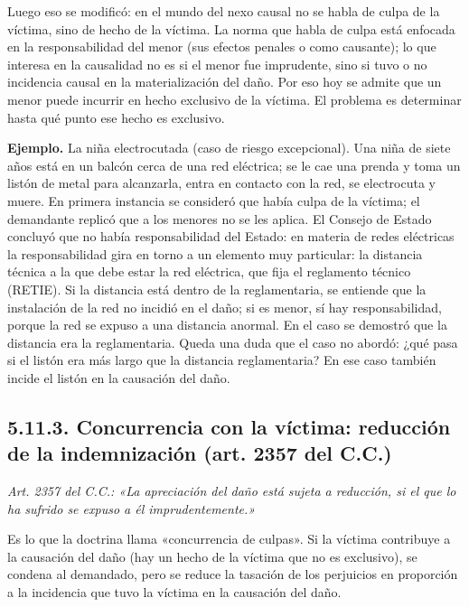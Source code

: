 Luego eso se modificó: en el mundo del nexo causal no se habla de culpa de la víctima, sino de hecho de la víctima. La norma que habla de culpa está enfocada en la responsabilidad del menor (sus efectos penales o como causante); lo que interesa en la causalidad no es si el menor fue imprudente, sino si tuvo o no incidencia causal en la materialización del daño. Por eso hoy se admite que un menor puede incurrir en hecho exclusivo de la víctima. El problema es determinar hasta qué punto ese hecho es exclusivo.

\begin{ejemplo}
\textcolor[HTML]{4F6228}{\textbf{Ejemplo. }}La niña electrocutada (caso de riesgo excepcional). Una niña de siete años está en un balcón cerca de una red eléctrica; se le cae una prenda y toma un listón de metal para alcanzarla, entra en contacto con la red, se electrocuta y muere. En primera instancia se consideró que había culpa de la víctima; el demandante replicó que a los menores no se les aplica. El Consejo de Estado concluyó que no había responsabilidad del Estado: en materia de redes eléctricas la responsabilidad gira en torno a un elemento muy particular: la distancia técnica a la que debe estar la red eléctrica, que fija el reglamento técnico (RETIE). Si la distancia está dentro de la reglamentaria, se entiende que la instalación de la red no incidió en el daño; si es menor, sí hay responsabilidad, porque la red se expuso a una distancia anormal. En el caso se demostró que la distancia era la reglamentaria. Queda una duda que el caso no abordó: ¿qué pasa si el listón era más largo que la distancia reglamentaria? En ese caso también incide el listón en la causación del daño.
\end{ejemplo}
\subsection{5.11.3. Concurrencia con la víctima: reducción de la indemnización (art. 2357 del C.C.)}
\begin{cita}
\textit{Art. 2357 del C.C.: «La apreciación del daño está sujeta a reducción, si el que lo ha sufrido se expuso a él imprudentemente.»}
\end{cita}
Es lo que la doctrina llama «concurrencia de culpas». Si la víctima contribuye a la causación del daño (hay un hecho de la víctima que no es exclusivo), se condena al demandado, pero se reduce la tasación de los perjuicios en proporción a la incidencia que tuvo la víctima en la causación del daño.

